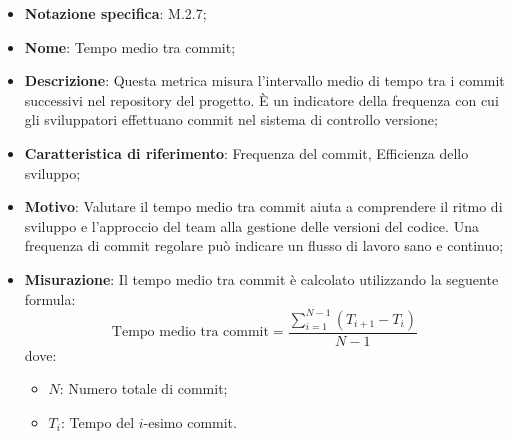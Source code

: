 \begin{itemize}
    \item \textbf{Notazione specifica}: M.2.7;
    \item \textbf{Nome}: Tempo medio tra commit;
    \item \textbf{Descrizione}: Questa metrica misura l'intervallo medio di tempo tra i commit successivi nel repository del progetto. È un indicatore della frequenza con cui gli sviluppatori effettuano commit nel sistema di controllo versione;
    \item \textbf{Caratteristica di riferimento}: Frequenza del commit, Efficienza dello sviluppo;
    \item \textbf{Motivo}: Valutare il tempo medio tra commit aiuta a comprendere il ritmo di sviluppo e l'approccio del team alla gestione delle versioni del codice. Una frequenza di commit regolare può indicare un flusso di lavoro sano e continuo;
    \item \textbf{Misurazione}: Il tempo medio tra commit è calcolato utilizzando la seguente formula:
    \[
        \text{Tempo medio tra commit} =\frac{\sum_{i=1}^{N-1} (T_{i+1} - T_i)}{N-1}
    \]
    dove:
    \begin{itemize}
        \item $N$: Numero totale di commit;
        \item $T_{i}$: Tempo del \(i\)-esimo commit.
    \end{itemize}
\end{itemize}

